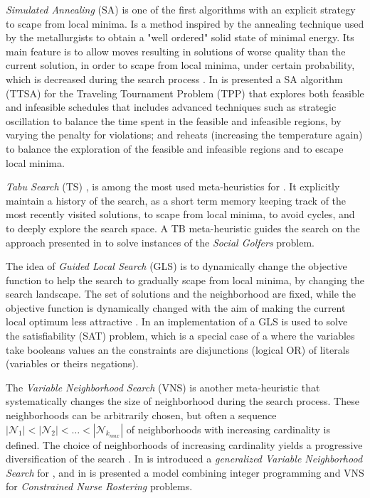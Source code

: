 {\it Simulated Annealing} (SA) \cite{Nikolaev2010} is one of the first algorithms with an explicit strategy to scape from local minima. Is a method inspired by the annealing technique used by the metallurgists to obtain a "well ordered" solid state of minimal energy. Its main feature is to allow moves resulting in solutions of worse quality than the current solution, in order to scape from local minima, under certain probability, which is decreased during the search process \cite{Blum2003}. In \cite{Anagnostopoulos2006} is presented a SA algorithm (TTSA) for the Traveling Tournament Problem (TPP) that explores both feasible and infeasible schedules that includes advanced techniques such as strategic oscillation to balance the time spent in the feasible and infeasible regions, by varying the penalty for violations; and reheats (increasing the temperature again) to balance the exploration of the feasible and infeasible regions and to escape local minima.

{\it Tabu Search} (TS) \cite{Gendreau2010}, is among the most used meta-heuristics for \COPs. It explicitly maintain a history of the search, as a short term memory keeping track of the most recently visited solutions, to scape from local minima, to avoid cycles, and to deeply explore the search space. A TB meta-heuristic guides the search on the approach presented in \cite{IvanDotu2007} to solve instances of the \textit{Social Golfers} problem.

The idea of {\it Guided Local Search} (GLS) \cite{Christos2010} is to dynamically change the objective function to help the search to gradually scape from local minima, by changing the search landscape. The set of solutions and the neighborhood are fixed, while the objective function is dynamically changed with the aim of making the current local optimum less attractive \cite{Blum2003}. In \cite{Mills2000} an implementation of a GLS is used to solve the satisfiability (SAT) problem, which is a special case of a \csp{} where the variables take booleans values an the constraints are disjunctions (logical OR) of literals (variables or theirs negations).

The \textit{Variable Neighborhood Search} (VNS) is another meta-heuristic that systematically changes the size of neighborhood during the search process. These neighborhoods can be arbitrarily chosen, but often a sequence $\left|\mathcal{N}_1\right|<\left|\mathcal{N}_2\right|< \dots<\left|\mathcal{N}_{k_{max}}\right|$ of neighborhoods with increasing cardinality is defined. The choice of neighborhoods of increasing cardinality yields a progressive diversification of the search \cite{PierreNenad,Blum2003}. In \cite{Bouhmala2015} is introduced a \textit{generalized Variable Neighborhood Search} for \COPs, and in \cite{Burke2010} is presented a model combining integer programming and VNS for \textit{Constrained Nurse Rostering} problems.

